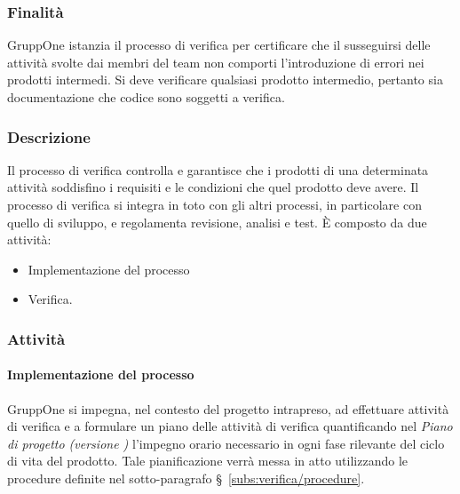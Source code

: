 \documentclass[../../norme-di-progetto.tex]{subfiles}
\begin{document}
\subsubsection{Finalità}%
\label{subs:verifica/finalita}

GruppOne istanzia il processo di verifica per certificare che il susseguirsi delle attività svolte dai membri del team non comporti l'introduzione di errori nei prodotti intermedi.
Si deve verificare qualsiasi prodotto intermedio, pertanto sia documentazione che codice sono soggetti a verifica.

\subsubsection{Descrizione}%
\label{subs:verifica/descrizione}

Il processo di verifica controlla e garantisce che i prodotti di una determinata attività soddisfino i requisiti e le condizioni che quel prodotto deve avere. Il processo di verifica si integra in toto con gli altri processi, in particolare con quello di sviluppo, e regolamenta revisione, analisi e test. È composto da due attività:

\begin{itemize}
  \item Implementazione del processo
  \item Verifica.
\end{itemize}

\subsubsection{Attività}%
\label{subs:verifica/attivita}

\paragraph{Implementazione del processo}%
\label{par:implementazione_di_processo}

GruppOne si impegna, nel contesto del progetto intrapreso, ad effettuare attività di verifica e a formulare un piano delle attività di verifica quantificando nel \textit{Piano di progetto (versione \versione)} l'impegno orario necessario in ogni fase rilevante del ciclo di vita del prodotto. Tale pianificazione verrà messa in atto utilizzando le procedure definite nel sotto-paragrafo §~\ref{subs:verifica/procedure}.

\end{document}
